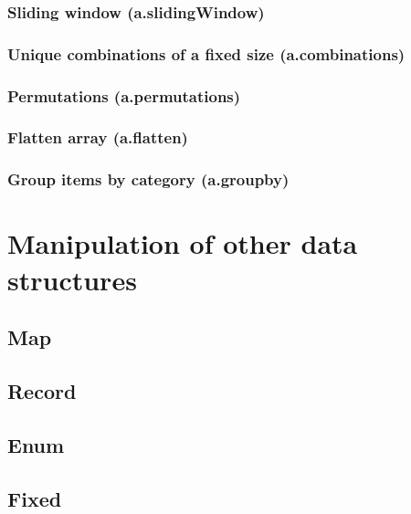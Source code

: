 \documentclass{article}
\theoremstyle{definition}
\begin{document}
\subsubsection{Sliding window (a.slidingWindow)}

\subsubsection{Unique combinations of a fixed size (a.combinations)}

\subsubsection{Permutations (a.permutations)}

\subsubsection{Flatten array (a.flatten)}

\subsubsection{Group items by category (a.groupby)}

\pagebreak

\section{Manipulation of other data structures}

\subsection{Map}

\subsection{Record}

\subsection{Enum}

\subsection{Fixed}

\pagebreak
\end{document}
